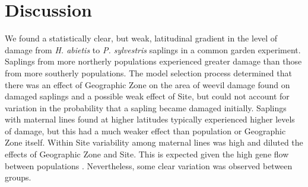 \documentclass[a4paper, 11pt]{article}
\begin{document}
\section*{Discussion}

We found a statistically clear, but weak, latitudinal gradient in the level of damage from \textit{H. abietis} to \textit{P. sylvestris} saplings in a common garden experiment. Saplings from more northerly populations experienced greater damage than those from more southerly populations. The model selection process determined that there was an effect of Geographic Zone on the area of weevil damage found on damaged saplings and a possible weak effect of Site, but could not account for variation in the probability that a sapling became damaged initially. Saplings with maternal lines found at higher latitudes typically experienced higher levels of damage, but this had a much weaker effect than population or Geographic Zone itself. Within Site variability among maternal lines was high and diluted the effects of Geographic Zone and Site. This is expected given the high gene flow between populations \citep{Donnelly2018}. Nevertheless, some clear variation was observed between groups.
\end{document}
